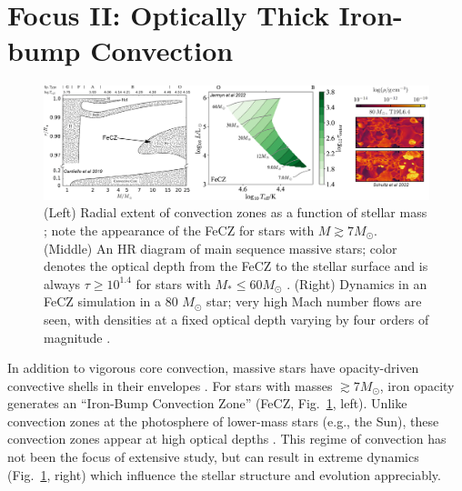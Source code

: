 \documentclass[11pt]{amsart} %
\theoremstyle{definition}
\numberwithin{equation}{section}
\begin{document}
\section{Focus II: Optically Thick Iron-bump Convection}
\begin{figure}[t!]
     \centering
     \captionsetup{width=0.97\linewidth}
     \includegraphics[width=\textwidth]{figures/fig3.png}
     \vspace{-0.7cm}
        \caption{
        (Left) Radial extent of convection zones as a function of stellar mass \citep[assuming metallicity $Z = 0.02$;][]{cantiello_braithwaite_2019}; note the appearance of the FeCZ for stars with $M \gtrsim 7 M_{\odot}$. (Middle) An HR diagram of main sequence massive stars; color denotes the optical depth from the FeCZ to the stellar surface and is always $\tau \geq 10^{1.4}$ for stars with $M_* \leq 60 M_{\odot}$  \citep{jermyn_etal_2022_atlas}. (Right) Dynamics in an FeCZ simulation in a 80 $M_{\odot}$ star; very high Mach number flows are seen, with densities at a fixed optical depth varying by four orders of magnitude \citep{schultz_etal_2022b}.
        \label{fig:fecz}
        \vspace{-0.5cm}}
\end{figure}

In addition to vigorous core convection, massive stars have opacity-driven convective shells in their envelopes \citep{cantiello_etal_2009}.
For stars with masses $\gtrsim 7 M_{\odot}$, iron opacity generates an ``Iron-Bump Convection Zone'' (FeCZ, Fig.~\ref{fig:fecz}, left).
Unlike convection zones at the photosphere of lower-mass stars (e.g., the Sun), these convection zones appear at high optical depths \citep[Fig.~\ref{fig:fecz}, middle;][]{jermyn_etal_2022_atlas}.
This regime of convection has not been the focus of extensive study, but can result in extreme dynamics (Fig.~\ref{fig:fecz}, right) which influence the stellar structure and evolution appreciably.

\end{document}

